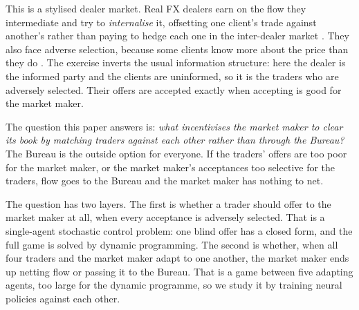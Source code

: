 \documentclass[11pt,a4paper]{article}
\theoremstyle{plain}
\theoremstyle{definition}
\newcommand{\1}{\mathbf{1}}
\begin{document}
This is a stylised dealer market. Real FX dealers earn on the flow they intermediate and try to \emph{internalise} it, offsetting one client's trade against another's rather than paying to hedge each one in the inter-dealer market \citep{butz2019}. They also face adverse selection, because some clients know more about the price than they do \citep{copeland1983,glosten1985}. The exercise inverts the usual information structure: here the dealer is the informed party and the clients are uninformed, so it is the traders who are adversely selected. Their offers are accepted exactly when accepting is good for the market maker.

The question this paper answers is: \emph{what incentivises the market maker to clear its book by matching traders against each other rather than through the Bureau?} The Bureau is the outside option for everyone. If the traders' offers are too poor for the market maker, or the market maker's acceptances too selective for the traders, flow goes to the Bureau and the market maker has nothing to net.

The question has two layers. The first is whether a trader should offer to the market maker at all, when every acceptance is adversely selected. That is a single-agent stochastic control problem: one blind offer has a closed form, and the full game is solved by dynamic programming. The second is whether, when all four traders and the market maker adapt to one another, the market maker ends up netting flow or passing it to the Bureau. That is a game between five adapting agents, too large for the dynamic programme, so we study it by training neural policies against each other.
\end{document}
